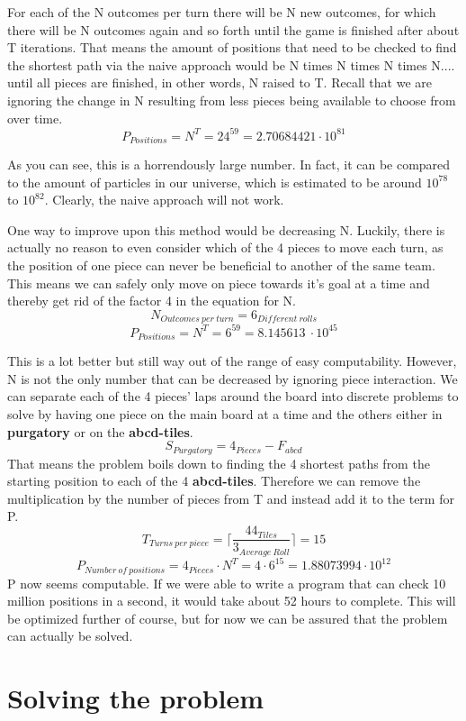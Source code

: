 \documentclass[12pt]{article}
\begin{document}
For each of the N outcomes per turn there will be N new outcomes, for which there will be N outcomes again and so forth until the game is finished after about T iterations. That means the amount of positions that need to be checked to find the shortest path via the naive approach would be N times N times N times N.... until all pieces are finished, in other words, N raised to T. Recall that we are ignoring the change in N resulting from less pieces being available to choose from over time.
\[
    P_{Positions} =  N^T = 24^{59} = 2.70684421 \cdot 10^{81}
\]

As you can see, this is a horrendously large number. In fact, it can be compared to the amount of particles in our universe, which is estimated to be around $10^{78}$ to $10^{82}$. Clearly, the naive approach will not work.

One way to improve upon this method would be decreasing N. Luckily, there is actually no reason to even consider which of the 4 pieces to move each turn, as the position of one piece can never be beneficial to another of the same team. This means we can safely only move on piece towards it's goal at a time and thereby get rid of the factor 4 in the equation for N.
\[
    N_{Outcomes~per~turn} = 6_{Different~rolls}
\]
\[
    P_{Positions} =  N^T = 6^{59} =8.145613\ \cdot 10^{45}
\]

This is a lot better but still way out of the range of easy computability.
However, N is not the only number that can be decreased by ignoring piece interaction. We can separate each of the 4 pieces' laps around the board into discrete problems to solve by having one piece on the main board at a time and the others either in \textbf{purgatory} or on the \textbf{abcd-tiles}.
\[
    S_{Purgatory} = 4_{Pieces} - F_{abcd}
\]
That means the problem boils down to finding the 4 shortest paths from the starting position to each of the 4 \textbf{abcd-tiles}.
Therefore we can remove the multiplication by the number of pieces from T and instead add it to the term for P.
\[
    T_{Turns~per~piece} =  \lceil \frac{44_{Tiles}}{3_{Average~Roll}}\rceil
    =  15
\]
\[
    P_{Number~of~positions} =  4_{Pieces} \cdot N^T = 4 \cdot 6^{15} = 1.88073994 \cdot 10^{12}
\]
P now seems computable. If we were able to write a program that can check 10 million positions in a second, it would take about
52 hours to complete. This will be optimized further of course, but for now we can be assured that the problem can actually be solved.


\section{Solving the problem}
\end{document}
